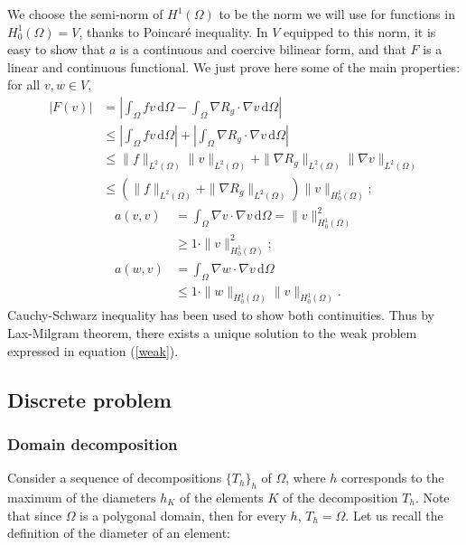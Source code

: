 We choose the semi-norm of $H^1(\Omega)$ to be the norm we will use for functions in $H^1_0(\Omega) = V$, thanks to Poincaré inequality. In $V$ equipped to this norm, it is easy to show that $a$ is a continuous and coercive bilinear form, and that $F$ is a linear and continuous functional. We just prove here some of the main properties: for all $v,w\in V$, 
\begin{align*}
\left|F(v)\right| &= \left|\int_\Omega fv \, \mathrm{d}\Omega -\int_\Omega \nabla R_g \cdot \nabla v \, \mathrm{d} \Omega\right| \\
& \leq \left|\int_\Omega fv \, \mathrm{d}\Omega\right| + \left|\int_\Omega \nabla R_g \cdot \nabla v \, \mathrm{d} \Omega\right|\\
& \leq \|f\|_{L^2(\Omega)}\|v\|_{L^2(\Omega)} + \|\nabla R_g\|_{L^2(\Omega)}\|\nabla v\|_{L^2(\Omega)}\\
& \leq \left(\|f\|_{L^2(\Omega)}+\|\nabla R_g\|_{L^2(\Omega)}\right)\|v\|_{H_0^1(\Omega)};
\end{align*}
\begin{align}
a(v,v) &= \int_\Omega \nabla v \cdot \nabla v \, \mathrm{d} \Omega = \|v\|^2_{H_0^1(\Omega)} \nonumber \\
& \geq 1\cdot \|v\|^2_{H_0^1(\Omega)}; \label{acoercive}\\
a(w,v) &= \int_\Omega \nabla w \cdot \nabla v \, \mathrm{d} \Omega \nonumber \\
& \leq 1 \cdot \|w\|_{H_0^1(\Omega)}\|v\|_{H_0^1(\Omega)}.\label{acontinue}
\end{align} 
Cauchy-Schwarz inequality has been used to show both continuities. Thus by Lax-Milgram theorem, there exists a unique solution to the weak problem expressed in equation (\ref{weak}). 


\subsection{Discrete problem}

\subsubsection{Domain decomposition}
Consider a sequence of decompositions $\{T_h\}_h$ of $\Omega$, where $h$ corresponds to the maximum of the diameters $h_K$ of the elements $K$ of the decomposition $T_h$. Note that since $\Omega$ is a polygonal domain, then for every $h$, $T_h = \Omega$. Let us recall the definition of the diameter of an element: 

